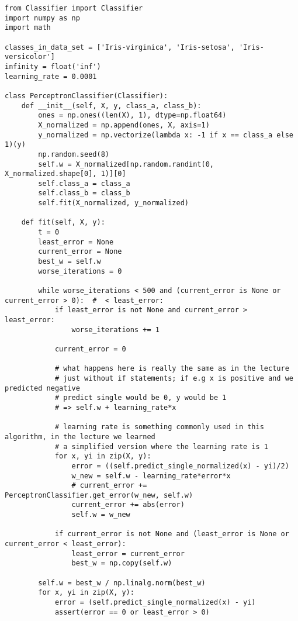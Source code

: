 \begin{lstlisting}[style=py]
from Classifier import Classifier
import numpy as np
import math

classes_in_data_set = ['Iris-virginica', 'Iris-setosa', 'Iris-versicolor']
infinity = float('inf')
learning_rate = 0.0001

class PerceptronClassifier(Classifier):
    def __init__(self, X, y, class_a, class_b):
        ones = np.ones((len(X), 1), dtype=np.float64)
        X_normalized = np.append(ones, X, axis=1)
        y_normalized = np.vectorize(lambda x: -1 if x == class_a else 1)(y)
        np.random.seed(8)
        self.w = X_normalized[np.random.randint(0, X_normalized.shape[0], 1)][0]
        self.class_a = class_a
        self.class_b = class_b
        self.fit(X_normalized, y_normalized)

    def fit(self, X, y):
        t = 0
        least_error = None
        current_error = None
        best_w = self.w
        worse_iterations = 0

        while worse_iterations < 500 and (current_error is None or current_error > 0):  #  < least_error:
            if least_error is not None and current_error > least_error:
                worse_iterations += 1

            current_error = 0

            # what happens here is really the same as in the lecture
            # just without if statements; if e.g x is positive and we predicted negative
            # predict single would be 0, y would be 1
            # => self.w + learning_rate*x

            # learning rate is something commonly used in this algorithm, in the lecture we learned
            # a simplified version where the learning rate is 1
            for x, yi in zip(X, y):
                error = ((self.predict_single_normalized(x) - yi)/2)
                w_new = self.w - learning_rate*error*x
                # current_error += PerceptronClassifier.get_error(w_new, self.w)
                current_error += abs(error)
                self.w = w_new

            if current_error is not None and (least_error is None or current_error < least_error):
                least_error = current_error
                best_w = np.copy(self.w)

        self.w = best_w / np.linalg.norm(best_w)
        for x, yi in zip(X, y):
            error = (self.predict_single_normalized(x) - yi)
            assert(error == 0 or least_error > 0)


\end{lstlisting}

